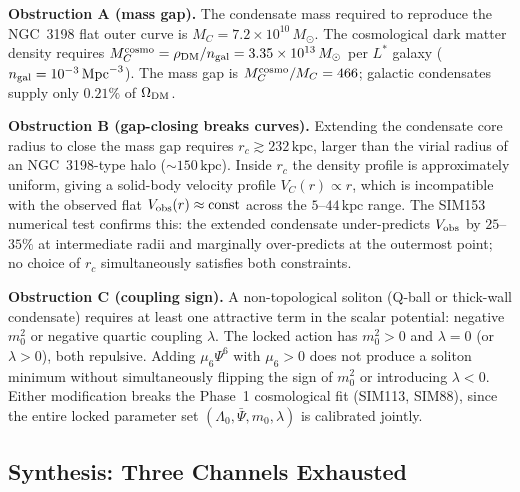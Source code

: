 \documentclass[12pt,a4paper]{article}
\newcommand{\Lz}{\Lambda_0}
\theoremstyle{plain}
\begin{document}
\textbf{Obstruction A (mass gap).}  The condensate mass required to reproduce the
NGC~3198 flat outer curve is $M_C = 7.2\times10^{10}\,M_\odot$.  The cosmological
dark matter density requires $M_C^{\rm cosmo} = \rho_{\rm DM}/n_{\rm gal} =
3.35\times10^{13}\,M_\odot$ per $L^*$ galaxy ($n_{\rm gal} = 10^{-3}\,\mathrm{Mpc}^{-3}$).
The mass gap is $M_C^{\rm cosmo}/M_C = 466$; galactic condensates supply only
$0.21\%$ of $\Omega_{\rm DM}$.

\textbf{Obstruction B (gap-closing breaks curves).}  Extending the condensate core
radius to close the mass gap requires $r_c \gtrsim 232\,\mathrm{kpc}$, larger than
the virial radius of an NGC~3198-type halo ($\sim150\,\mathrm{kpc}$).  Inside
$r_c$ the density profile is approximately uniform, giving a solid-body velocity
profile $V_C(r) \propto r$, which is incompatible with the observed flat
$V_{\rm obs}(r) \approx \text{const}$ across the $5$--$44\,\mathrm{kpc}$ range.
The SIM153 numerical test confirms this: the extended condensate under-predicts
$V_{\rm obs}$ by $25$--$35\%$ at intermediate radii and marginally over-predicts
at the outermost point; no choice of $r_c$ simultaneously satisfies both
constraints.

\textbf{Obstruction C (coupling sign).}  A non-topological soliton (Q-ball or
thick-wall condensate) requires at least one attractive term in the scalar
potential: negative $m_0^2$ or negative quartic coupling $\lambda$.  The locked
action has $m_0^2 > 0$ and $\lambda = 0$ (or $\lambda > 0$), both repulsive.
Adding $\mu_6\Psi^6$ with $\mu_6 > 0$ does not produce a soliton minimum without
simultaneously flipping the sign of $m_0^2$ or introducing $\lambda < 0$.
Either modification breaks the Phase~1 cosmological fit (SIM113, SIM88), since the
entire locked parameter set $(\Lz, \bar\Psi, m_0, \lambda)$ is calibrated jointly.

\subsection{Synthesis: Three Channels Exhausted}
\label{sec:synthesis}
\end{document}
